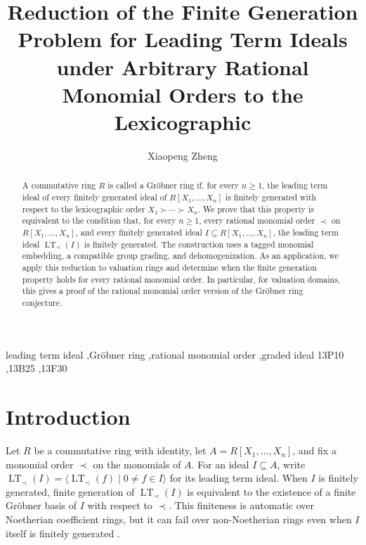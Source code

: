 \documentclass[preprint,12pt,3p]{elsarticle}
\theoremstyle{definition}
\theoremstyle{remark}
\newcommand{\LT}{\operatorname{LT}}
\begin{document}
	
	\begin{frontmatter}
		
		\title{Reduction of the Finite Generation Problem for Leading Term
			Ideals under Arbitrary Rational Monomial Orders to the Lexicographic}
		
		\author[stu]{Xiaopeng Zheng}
		
		\address[stu]{College of Mathematics and Computer Science, Shantou University,
			Shantou 515821, China}
		
		\begin{abstract}
			A commutative ring $R$ is called a Gr\"obner ring if, for every
			$n\geq 1$, the leading term ideal of every finitely generated ideal
			of $R[X_1,\ldots,X_n]$ is finitely generated with respect to the
			lexicographic order $X_1\succ\cdots\succ X_n$. We prove that this
			property is equivalent to the
			condition that, for every $n\geq 1$, every rational monomial order
			$\prec$ on $R[X_1,\ldots,X_n]$, and every finitely generated ideal
			$I\subseteq R[X_1,\ldots,X_n]$, the leading term ideal
			$\operatorname{LT}_{\prec}(I)$ is finitely generated. The
			construction uses a tagged monomial embedding, a compatible group
			grading, and dehomogenization. As an application, we apply this reduction to valuation rings and
			determine when the finite generation property holds for every rational
			monomial order. In particular, for valuation domains, this gives a proof
			of the rational monomial order version of the Gr\"obner ring conjecture.
		\end{abstract}
		\begin{keyword}
			leading term ideal \sep Gr\"obner ring \sep rational monomial order
			\sep graded ideal
		\MSC[2020] 13P10 \sep 13B25 \sep 13F30
		\end{keyword}
		
		
	\end{frontmatter}
	
	
	
	
	\section{Introduction}
	
	Let $R$ be a commutative ring with identity, let
	$A=R[X_1,\ldots,X_n]$, and fix a monomial order $\prec$ on the
	monomials of $A$. For an ideal $I\subseteq A$, write
	$\LT_\prec(I)=\langle \LT_\prec(f)\mid 0\neq f\in I\rangle$ for its
	leading term ideal. When $I$ is finitely generated, finite generation
	of $\LT_\prec(I)$ is equivalent to the existence of a finite
	Gr\"obner basis of $I$ with respect to $\prec$. This finiteness is
	automatic over Noetherian coefficient rings, but it can fail over
	non-Noetherian rings even when $I$ itself is finitely generated
	\cite{AdamsLoustaunau1994,Pauer2007,MonceurYengui2012,
		PolaYengui2012Negative}.
	
\end{document}
